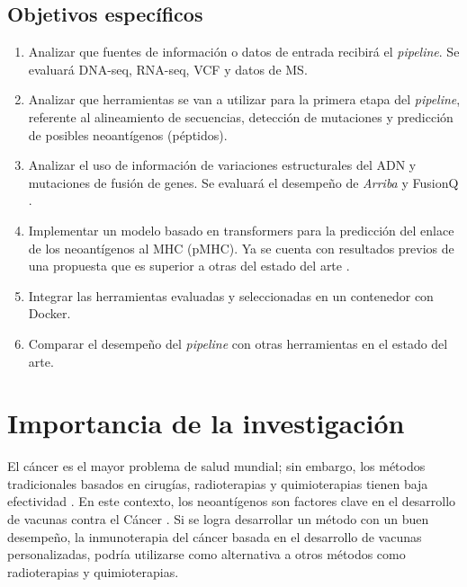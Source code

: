 \documentclass[a4paper]{article}
\begin{document}
	\subsection{Objetivos específicos}
	\begin{enumerate}
		\item Analizar que fuentes de información o datos de entrada recibirá el \textit{pipeline}. Se evaluará DNA-seq, RNA-seq, VCF y datos de MS.
		
		\item Analizar que herramientas se van a utilizar para la primera etapa del \textit{pipeline}, referente al alineamiento de secuencias, detección de mutaciones y predicción de posibles neoantígenos (péptidos). 
		
		\item Analizar el uso de información de variaciones estructurales del ADN y mutaciones de fusión de genes. Se evaluará el desempeño de \textit{Arriba} \citep{uhrig2021accurate} y FusionQ \citep{liu2013fusionq}.
		 
		\item Implementar un modelo basado en transformers para la predicción del enlace de los neoantígenos al MHC (pMHC). Ya se cuenta con resultados previos de una propuesta que es superior a otras del estado del arte \citep{arceda2023neoantigen}.
		
		\item Integrar las herramientas evaluadas y seleccionadas en un contenedor con Docker.
		\item Comparar el desempeño del \textit{pipeline} con otras herramientas en el estado del arte.

		

		
	\end{enumerate}

	
\section{Importancia de la investigación}

El cáncer es el mayor problema de salud mundial; sin embargo, los métodos tradicionales basados en cirugías, radioterapias y quimioterapias tienen baja efectividad \citep{peng2019neoantigen}. En este contexto, los neoantígenos son factores clave en el desarrollo de vacunas contra el Cáncer  \citep{borden2022cancer,chen2021challenges,gopanenko2020main}. Si se logra desarrollar un método con un buen desempeño, la inmunoterapia del cáncer basada en el desarrollo de vacunas personalizadas, podría utilizarse como alternativa a otros métodos como radioterapias y quimioterapias. \\
\end{document}
